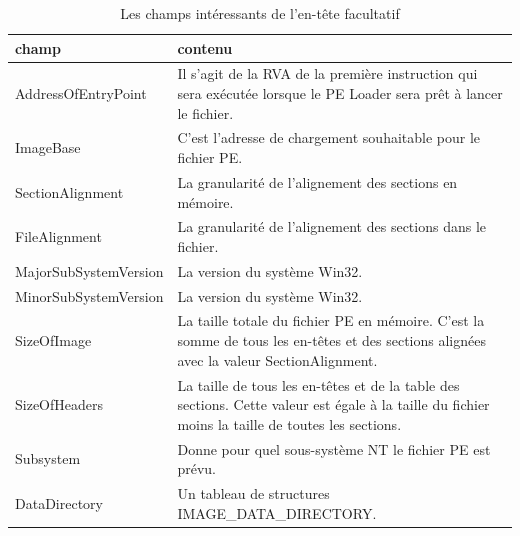 \begin{table}[h]
\begin{tabular}{|p{4.5cm}|p{11cm}|}
\hline \textbf{champ} &  \textbf{contenu}\\
\hline AddressOfEntryPoint & Il s'agit de la RVA de la première instruction qui sera exécutée lorsque le PE Loader sera prêt à lancer le fichier.\\
\hline ImageBase &	C'est l'adresse de chargement souhaitable pour le fichier PE.\\
\hline SectionAlignment & La granularité de l'alignement des sections en mémoire.\\
\hline FileAlignment & La granularité de l'alignement des sections dans le fichier.\\
\hline MajorSubSystemVersion & La version du système Win32.\\
\hline MinorSubSystemVersion & La version du système Win32.\\
\hline SizeOfImage & La taille totale du fichier PE en mémoire. C'est la somme de tous les en-têtes et des sections alignées avec la valeur SectionAlignment.\\
\hline SizeOfHeaders & La taille de tous les en-têtes et de la table des sections. Cette valeur est égale à la taille du fichier moins la taille de toutes les sections.\\
\hline Subsystem & Donne pour quel sous-système NT le fichier PE est prévu.\\
\hline DataDirectory & Un tableau de structures IMAGE\_DATA\_DIRECTORY.\\
\hline

\end{tabular}
\caption{Les champs intéressants de l'en-tête facultatif}
\label{tab2}
\end{table}

